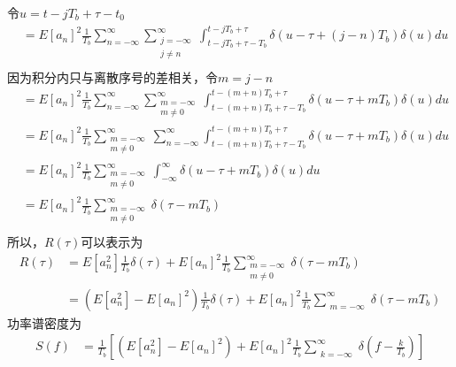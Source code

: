 \documentclass[
]{article}
\begin{document}
令$u=t-jT_b+\tau-t_0$
\begin{equation}
\begin{aligned}
&= E[a_n]^2 \frac{1}{T_b} \sum\limits_{n=-\infty}^{\infty} \sum\limits_{\substack{j=-\infty\\j\neq n}}^{\infty} \int_{t-jT_b+\tau-T_b}^{t-jT_b+\tau}\delta(u-\tau+(j-n)T_b) \delta(u) du\\
\end{aligned}
\end{equation}
因为积分内只与离散序号的差相关，令$m=j-n$
\begin{equation}
\begin{aligned}
&= E[a_n]^2 \frac{1}{T_b} \sum\limits_{n=-\infty}^{\infty} \sum\limits_{\substack{m=-\infty\\m\neq 0}}^{\infty} \int_{t-(m+n)T_b+\tau-T_b}^{t-(m+n)T_b+\tau} \delta(u-\tau+mT_b) \delta(u) du\\
&= E[a_n]^2 \frac{1}{T_b} \sum\limits_{\substack{m=-\infty\\m\neq 0}}^{\infty} \sum\limits_{n=-\infty}^{\infty} \int_{t-(m+n)T_b+\tau-T_b}^{t-(m+n)T_b+\tau} \delta(u-\tau+mT_b) \delta(u) du\\
&= E[a_n]^2 \frac{1}{T_b} \sum\limits_{\substack{m=-\infty\\m\neq 0}}^{\infty} \int_{-\infty}^{\infty}\delta(u-\tau+mT_b) \delta(u) du\\
&= E[a_n]^2 \frac{1}{T_b} \sum\limits_{\substack{m=-\infty\\m\neq 0}}^{\infty} \delta(\tau-mT_b)\\
\end{aligned}
\end{equation}
所以，$R(\tau)$可以表示为
\begin{equation}
\begin{aligned}
R(\tau) &= E[a_n^2]\frac{1}{T_b} \delta(\tau) + E[a_n]^2 \frac{1}{T_b} \sum\limits_{\substack{m=-\infty\\m\neq 0}}^{\infty} \delta(\tau-mT_b)\\
&= (E[a_n^2]- E[a_n]^2) \frac{1}{T_b} \delta(\tau) + E[a_n]^2 \frac{1}{T_b} \sum\limits_{\substack{m=-\infty}}^{\infty} \delta(\tau-mT_b)
\end{aligned}
\end{equation}
功率谱密度为\\
\begin{equation}
\begin{aligned}
S(f) &= \frac{1}{T_b} [(E[a_n^2]- E[a_n]^2) + E[a_n]^2 \frac{1}{T_b} \sum\limits_{\substack{k=-\infty}}^{\infty} \delta(f-\frac{k}{T_b})]\\
\end{aligned}
\end{equation}
\end{document}
